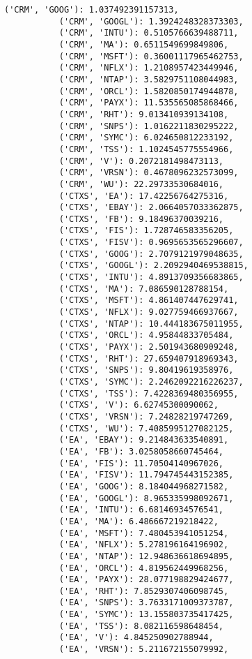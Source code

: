 \documentclass[11pt]{article}
\begin{document}
\begin{Verbatim}[commandchars=\\\{\}]
           ('CRM', 'GOOG'): 1.037492391157313,
           ('CRM', 'GOOGL'): 1.3924248328373303,
           ('CRM', 'INTU'): 0.5105766639488711,
           ('CRM', 'MA'): 0.6511549699849806,
           ('CRM', 'MSFT'): 0.36001117965462753,
           ('CRM', 'NFLX'): 1.2108957423449946,
           ('CRM', 'NTAP'): 3.5829751108044983,
           ('CRM', 'ORCL'): 1.5820850174944878,
           ('CRM', 'PAYX'): 11.535565085868466,
           ('CRM', 'RHT'): 9.013410939134108,
           ('CRM', 'SNPS'): 1.0162211830295222,
           ('CRM', 'SYMC'): 6.024650812233192,
           ('CRM', 'TSS'): 1.1024545775554966,
           ('CRM', 'V'): 0.2072181498473113,
           ('CRM', 'VRSN'): 0.4678096232573099,
           ('CRM', 'WU'): 22.29733530684016,
           ('CTXS', 'EA'): 17.42256764275316,
           ('CTXS', 'EBAY'): 2.0664057033362875,
           ('CTXS', 'FB'): 9.18496370039216,
           ('CTXS', 'FIS'): 1.728746583356205,
           ('CTXS', 'FISV'): 0.9695653565296607,
           ('CTXS', 'GOOG'): 2.7079121979048635,
           ('CTXS', 'GOOGL'): 2.2092940469538815,
           ('CTXS', 'INTU'): 4.8913709356683865,
           ('CTXS', 'MA'): 7.086590128788154,
           ('CTXS', 'MSFT'): 4.861407447629741,
           ('CTXS', 'NFLX'): 9.027759466937667,
           ('CTXS', 'NTAP'): 10.444183675011955,
           ('CTXS', 'ORCL'): 4.95844833705484,
           ('CTXS', 'PAYX'): 2.501943680909248,
           ('CTXS', 'RHT'): 27.659407918969343,
           ('CTXS', 'SNPS'): 9.80419619358976,
           ('CTXS', 'SYMC'): 2.2462092216226237,
           ('CTXS', 'TSS'): 7.4228369480356955,
           ('CTXS', 'V'): 6.62745300090062,
           ('CTXS', 'VRSN'): 7.24828219747269,
           ('CTXS', 'WU'): 7.4085995127082125,
           ('EA', 'EBAY'): 9.214843633540891,
           ('EA', 'FB'): 3.0258058660745464,
           ('EA', 'FIS'): 11.70504140967026,
           ('EA', 'FISV'): 11.794745443152385,
           ('EA', 'GOOG'): 8.184044968271582,
           ('EA', 'GOOGL'): 8.965335998092671,
           ('EA', 'INTU'): 6.68146934576541,
           ('EA', 'MA'): 6.486667219218422,
           ('EA', 'MSFT'): 7.480453941051254,
           ('EA', 'NFLX'): 5.278196164196902,
           ('EA', 'NTAP'): 12.948636618694895,
           ('EA', 'ORCL'): 4.819562449968256,
           ('EA', 'PAYX'): 28.077198829424677,
           ('EA', 'RHT'): 7.8529307406098745,
           ('EA', 'SNPS'): 3.7633171009373787,
           ('EA', 'SYMC'): 13.155803735417425,
           ('EA', 'TSS'): 8.082116598648454,
           ('EA', 'V'): 4.845250902788944,
           ('EA', 'VRSN'): 5.211672155079992,

\end{Verbatim}
\end{document}
